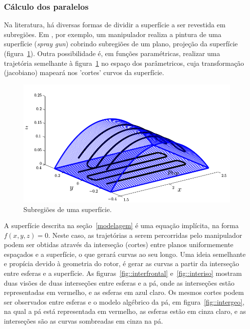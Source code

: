 \subsubsection{Cálculo dos paralelos}\label{paralelos}
Na literatura, há diversas formas de dividir a superfície a ser revestida em
subregiões. Em \cite{from2010off}, por exemplo, um manipulador realiza a pintura
de uma superfície (\textit{spray gun}) cobrindo subregiões de um plano, projeção
 da superfície (figura~\ref{fig::pal}). Outra possibilidade é,
em funções
paramétricas, realizar uma trajetória semelhante à figura~\ref{fig::pal} no
espaço dos parâmetricos, cuja transformação (jacobiano) mapeará nos 'cortes' curvos da
superfície.

\begin{figure}[!ht]
	\centering	
	\includegraphics[width=\columnwidth]{figs/planejamento/pal.png}
	\caption{Subregiões de uma superfície.}
	\label{fig::pal}
\end{figure}



A superfície descrita na seção~\ref{modelagem} é uma equação implícita, na forma
$f(x,y,z)=0$. Neste caso, as trajetórias a serem percorridas pelo manipulador
podem ser obtidas através da interseção (cortes) entre planos uniformemente
espaçados e a superfície, o que gerará curvas ao seu longo. Uma
ideia semelhante e propícia devido à geometria do rotor, é gerar as curvas a partir da interseção
entre esferas e a superfície. As figuras~\ref{fig::interfrontal}
e~\ref{fig::interiso} mostram duas visões de duas interseções entre esferas e
a pá, onde as interseções estão representadas em vermelho, e as esferas em
azul claro. Os mesmos cortes podem ser observados entre esferas e o modelo
algébrico da pá, em figura~\ref{fig::intergeo}, na qual a pá está representada
em vermelho, as esferas estão em cinza claro, e as interseções são as curvas
sombreadas em cinza na pá.

